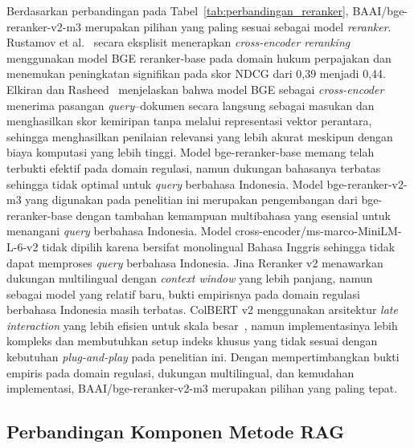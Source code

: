 Berdasarkan perbandingan pada Tabel~\ref{tab:perbandingan_reranker}, BAAI/bge-reranker-v2-m3 merupakan pilihan yang paling sesuai sebagai model \textit{reranker}. Rustamov et al.~\cite{rustamov2025tax} secara eksplisit menerapkan \textit{cross-encoder reranking} menggunakan model BGE reranker-base pada domain hukum perpajakan dan menemukan peningkatan signifikan pada skor NDCG dari 0,39 menjadi 0,44. Elkiran dan Rasheed~\cite{elkiran2026empirical} menjelaskan bahwa model BGE sebagai \textit{cross-encoder} menerima pasangan \textit{query}--dokumen secara langsung sebagai masukan dan menghasilkan skor kemiripan tanpa melalui representasi vektor perantara, sehingga menghasilkan penilaian relevansi yang lebih akurat meskipun dengan biaya komputasi yang lebih tinggi. Model bge-reranker-base memang telah terbukti efektif pada domain regulasi, namun dukungan bahasanya terbatas sehingga tidak optimal untuk \textit{query} berbahasa Indonesia. Model bge-reranker-v2-m3 yang digunakan pada penelitian ini merupakan pengembangan dari bge-reranker-base dengan tambahan kemampuan multibahasa yang esensial untuk menangani \textit{query} berbahasa Indonesia. Model cross-encoder/ms-marco-MiniLM-L-6-v2 tidak dipilih karena bersifat monolingual Bahasa Inggris sehingga tidak dapat memproses \textit{query} berbahasa Indonesia. Jina Reranker v2 menawarkan dukungan multilingual dengan \textit{context window} yang lebih panjang, namun sebagai model yang relatif baru, bukti empirisnya pada domain regulasi berbahasa Indonesia masih terbatas. ColBERT v2 menggunakan arsitektur \textit{late interaction} yang lebih efisien untuk skala besar~\cite{khattab2020colbert}, namun implementasinya lebih kompleks dan membutuhkan setup indeks khusus yang tidak sesuai dengan kebutuhan \textit{plug-and-play} pada penelitian ini. Dengan mempertimbangkan bukti empiris pada domain regulasi, dukungan multilingual, dan kemudahan implementasi, BAAI/bge-reranker-v2-m3 merupakan pilihan yang paling tepat.

\subsection{Perbandingan Komponen Metode RAG}

